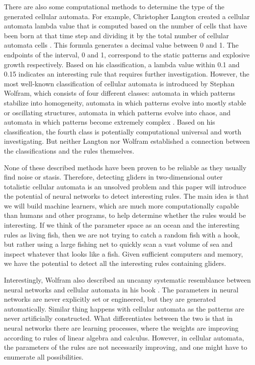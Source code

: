 \documentclass[12pt]{article}
\numberwithin{figure}{section} %
\begin{document}
There are also some computational methods to determine the type of the generated cellular automata. For example, Christopher Langton created a cellular automata lambda value that is computed based on the number of cells that have been born at that time step and dividing it by the total number of cellular automata cells \cite{Edge of Chaos}. This formula generates a decimal value between 0 and 1. The endpoints of the interval, 0 and 1, correspond to the static patterns and explosive growth respectively. Based on his classification, a lambda value within 0.1 and 0.15 indicates an interesting rule that requires further investigation. However, the most well-known classification of cellular automata is introduced by Stephan Wolfram, which consists of four different classes: automata in which patterns stabilize into homogeneity, automata in which patterns evolve into mostly stable or oscillating structures, automata in which patterns evolve into chaos, and automata in which patterns become extremely complex \cite{Cellular automaton}. Based on his classification, the fourth class is potentially computational universal and worth investigating. But neither Langton nor Wolfram established a connection between the classifications and the rules themselves.  

None of these described methods have been proven to be reliable as they usually find noise or stasis. Therefore, detecting gliders in two-dimensional outer totalistic cellular automata is an unsolved problem and this paper will introduce the potential of neural networks to detect interesting rules. The main idea is that we will build machine learners, which are much more computationally capable than humans and other programs, to help determine whether the rules would be interesting. If we think of the parameter space as an ocean and the interesting rules as living fish, then we are not trying to catch a random fish with a hook, but rather using a large fishing net to quickly scan a vast volume of sea and inspect whatever that looks like a fish. Given sufficient computers and memory, we have the potential to detect all the interesting rules containing gliders. 

Interestingly, Wolfram also described an uncanny systematic resemblance between neural networks and cellular automata in his book \cite{A new kind of Science}. The parameters in neural networks are never explicitly set or engineered, but they are generated automatically. Similar thing happens with cellular automata as the patterns are never artificially constructed. What differentiates between the two is that in neural networks there are learning processes, where the weights are improving according to rules of linear algebra and calculus. However, in cellular automata, the parameters of the rules are not necessarily improving, and one might have to enumerate all possibilities.
\end{document}
